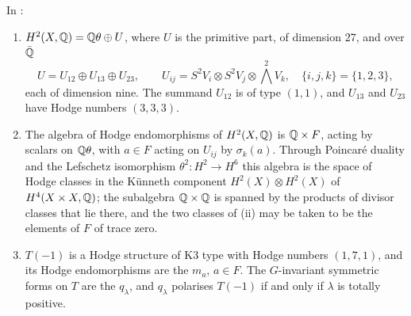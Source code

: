 \begin{proposition}%
\label{prop:mumfordrm}
In :
\begin{enumerate}[label=\textup{(\roman*)},nosep,leftmargin=2.6em]
\item $H^{2}(X,\mathbb{Q})=\mathbb{Q}\theta\oplus U$, where $U$ is the primitive part, of
  dimension $27$, and over $\bar{\mathbb{Q}}$
  \[
    U=U_{12}\oplus U_{13}\oplus U_{23},\qquad
    U_{ij}=S^{2}V_{i}\otimes S^{2}V_{j}\otimes{\textstyle\bigwedge^{2}}V_{k},
    \quad \{i,j,k\}=\{1,2,3\},
  \]
  each of dimension nine. The summand $U_{12}$ is of type $(1,1)$, and
  $U_{13}$ and $U_{23}$ have Hodge numbers $(3,3,3)$.
\item The algebra of Hodge endomorphisms of $H^{2}(X,\mathbb{Q})$ is $\mathbb{Q}\times F$,
  acting by scalars on $\mathbb{Q}\theta$, with $a\in F$ acting on $U_{ij}$ by
  $\sigma_{k}(a)$. Through Poincar\'e duality and the Lefschetz isomorphism
  $\theta^{2}\colon H^{2}\to H^{6}$ this algebra is the space of Hodge classes
  in the K\"unneth component $H^{2}(X)\otimes H^{2}(X)$ of
  $H^{4}(X\times X,\mathbb{Q})$; the subalgebra $\mathbb{Q}\times\mathbb{Q}$ is spanned by the
  products of divisor classes that lie there, and the two classes of
  (ii) may be taken to be the elements of $F$ of
  trace zero.
\item $T(-1)$ is a Hodge structure of K3 type with Hodge numbers $(1,7,1)$,
  and its Hodge endomorphisms are the $m_{a}$, $a\in F$. The $G$-invariant
  symmetric forms on $T$ are the $q_{\lambda}$, and $q_{\lambda}$ polarises
  $T(-1)$ if and only if $\lambda$ is totally positive.
\end{enumerate}
\end{proposition}

